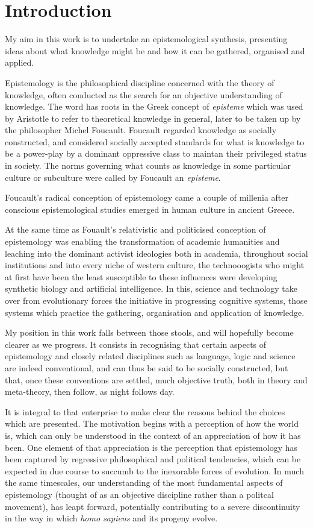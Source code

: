\mainmatter
\chapter{Introduction}\label{chap:Introduction}

My aim in this work is to undertake an epistemological synthesis, presenting ideas about what knowledge might be and how it can be gathered, organised and applied.

Epistemology is the philosophical discipline concerned with the theory of knowledge, often conducted as the search for an objective understanding of knowledge.
The word has roots in the Greek concept of \emph{episteme} which was used by Aristotle to refer to theoretical knowledge in general, later to be taken up by the philosopher Michel Foucault.
Foucault regarded knowledge as socially constructed, and considered socially accepted standards for what is knowledge to be a power-play by a dominant oppressive class to maintan their privileged status in society.
The norms governing what counts as knowledge in some particular culture or subculture were called by Foucault an \emph{episteme}.

Foucault's radical conception of epistemology came a couple of millenia after conscious epistemological studies emerged in human culture in ancient Greece.

At the same time as Fouault's relativistic and politicised conception of epistemology was enabling the transformation of academic humanities and leaching into the dominant activist ideologies both in academia, throughout social institutions and into every niche of western culture, the technooogists who might at first have been the least susceptible to these influences were developing synthetic biology and artificial intelligence.
In this, science and technology take over from evolutionary forces the initiative in progressing cognitive systems, those systems which practice the gathering, organisation and application of knowledge.

My position in this work falls between those stools, and will hopefully become clearer as we progress.
It consists in recognising that certain aspects of epistemology and closely related disciplines such as language, logic and science are indeed conventional, and can thus be said to be socially constructed, but that, once these conventions are settled, much objective truth, both in theory and meta-theory, then follow, as night follows day.

It is integral to that enterprise to make clear the reasons behind the choices which are presented.
The motivation begins with a perception of how the world is, which can only be understood in the context of an appreciation of how it has been.
One element of that appreciation is the perception that epistemology has been captured by regressive philosophical and political tendencies, which can be expected in due course to succumb to the inexorable forces of evolution.
In much the same timescales, our understanding of the most fundamental aspects of epistemology (thought of as an objective discipline rather than a politcal movement), has leapt forward, potentially  contributing to a severe discontinuity in the way in which \emph{homo sapiens} and its progeny evolve.

